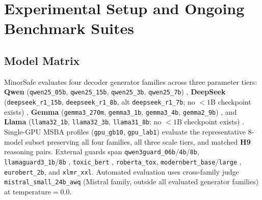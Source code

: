 \documentclass[11pt,letterpaper]{article}
\begin{document}
\section{Experimental Setup and Ongoing Benchmark Suites}

\subsection{Model Matrix}
MinorSafe evaluates four decoder generator families across three parameter tiers: \textbf{Qwen} (\texttt{qwen25\_05b}, \texttt{qwen25\_15b}, \texttt{qwen25\_3b}, \texttt{qwen25\_7b}) \citep{qwen2025qwen25}, \textbf{DeepSeek} (\texttt{deepseek\_r1\_15b}, \texttt{deepseek\_r1\_8b}, alt \texttt{deepseek\_r1\_7b}; no $<1\text{B}$ checkpoint exists) \citep{deepseek2025r1}, \textbf{Gemma} (\texttt{gemma3\_270m}, \texttt{gemma3\_1b}, \texttt{gemma3\_4b}, \texttt{gemma2\_9b}) \citep{gemma2025gemma3}, and \textbf{Llama} (\texttt{llama32\_1b}, \texttt{llama32\_3b}, \texttt{llama31\_8b}; no $<1\text{B}$ checkpoint exists) \citep{grattafiori2024llama3}. Single-GPU MSBA profiles (\texttt{gpu\_gb10}, \texttt{gpu\_lab1}) evaluate the representative 8-model subset preserving all four families, all three scale tiers, and matched \textbf{H9} reasoning pairs. External guards span \texttt{qwen3guard\_06b}/\texttt{4b}/\texttt{8b}, \texttt{llamaguard3\_1b}/\texttt{8b} \citep{inan2023llamaguard}, \texttt{toxic\_bert} \citep{hanu2020detoxify}, \texttt{roberta\_tox}, \texttt{modernbert\_base}/\texttt{large} \citep{warner2024modernbert}, \texttt{eurobert\_2b}, and \texttt{xlmr\_xxl}. Automated evaluation uses cross-family judge \texttt{mistral\_small\_24b\_awq} (Mistral family, outside all evaluated generator families) at $\text{temperature}=0.0$.
\end{document}
